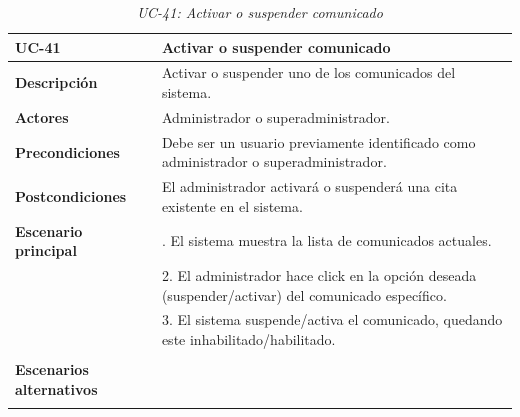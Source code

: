 \begin{table}
  \begin{center}
    \begin{tabularx}{16.4cm}{|l|X|}
      \hline
      \textbf{UC-41} & \textbf{Activar o suspender comunicado}\\
      \hline
      \textbf{Descripción} & Activar o suspender uno de los comunicados del sistema.\\
      \hline
      \textbf{Actores} & Administrador o superadministrador.\\
      \hline
      \textbf{Precondiciones} & Debe ser un usuario previamente identificado como administrador o superadministrador.\\
      \hline
      \textbf{Postcondiciones} & El administrador activará o suspenderá una cita existente en el sistema.\\
      \hline
      \textbf{Escenario principal} & \smallskip 1. El sistema muestra la lista de comunicados actuales.\\
      & 2. El administrador hace click en la opción deseada (suspender/activar) del comunicado específico.\\
      & 3. El sistema suspende/activa el comunicado, quedando este inhabilitado/habilitado.\\
      & \\
      \hline
      \textbf{Escenarios alternativos} & \smallskip \\
      & \\
      \hline
    \end{tabularx}
    \caption{\textit{UC-41: Activar o suspender comunicado}}
    \label{tab:CU-activar-suspender-comunicado}
  \end{center}
\end{table}


